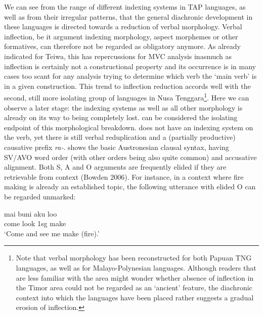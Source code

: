 We can see from the range of different indexing systems in TAP languages, as well as from their irregular patterns, that the general diachronic development in these languages is directed towards a reduction of verbal morphology. Verbal inflection, be it argument indexing morphology, aspect morphemes or other formatives, can therefore not be regarded as obligatory anymore. As already indicated for Teiwa, this has repercussions for MVC analysis inasmuch as inflection is certainly not a constructional property and its occurrence is in many cases too scant for any analysis trying to determine which verb the `main verb' is in a given construction. This trend to inflection reduction accords well with the second, still more isolating group of languages in Nusa Tenggara\footnote{Note that verbal morphology has been reconstructed for both Papuan TNG languages, as well as for Malayo-Polynesian languages. Although readers that are less familiar with the area might wonder whether absence of inflection in the Timor area could not be regarded as an `ancient' feature, the diachronic context into which the languages have been placed rather suggests a gradual erosion of inflection.}. Here we can observe a later stage: the indexing systems as well as all other morphology is already on its way to being completely lost.  can be considered the isolating endpoint of this morphological breakdown.  does not have an indexing system on the verb, yet there is still verbal reduplication and a (partially productive) causative prefix \textit{ra-}.  shows the basic Austronesian clausal syntax, having SV/AVO word order (with other orders being also quite common) and accusative alignment. Both S, A and O arguments are frequently elided if they are retrievable from context (Bowden 2006). For instance, in a context where fire making is already an established topic, the following utterance with elided O can be regarded unmarked:

\ea 
\gll mai buni aku loo \\
come look \acs{1}\acs{sg} make \\
\glft ‘Come and see me make (fire).’ \\ 
\endgl
\xe

